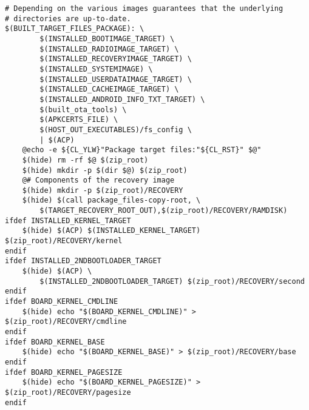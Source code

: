 \documentclass[12pt,a4paper]{article}
\begin{document}
\begin{verbatim}
# Depending on the various images guarantees that the underlying
# directories are up-to-date.
$(BUILT_TARGET_FILES_PACKAGE): \
		$(INSTALLED_BOOTIMAGE_TARGET) \
		$(INSTALLED_RADIOIMAGE_TARGET) \
		$(INSTALLED_RECOVERYIMAGE_TARGET) \
		$(INSTALLED_SYSTEMIMAGE) \
		$(INSTALLED_USERDATAIMAGE_TARGET) \
		$(INSTALLED_CACHEIMAGE_TARGET) \
		$(INSTALLED_ANDROID_INFO_TXT_TARGET) \
		$(built_ota_tools) \
		$(APKCERTS_FILE) \
		$(HOST_OUT_EXECUTABLES)/fs_config \
		| $(ACP)
	@echo -e ${CL_YLW}"Package target files:"${CL_RST}" $@"
	$(hide) rm -rf $@ $(zip_root)
	$(hide) mkdir -p $(dir $@) $(zip_root)
	@# Components of the recovery image
	$(hide) mkdir -p $(zip_root)/RECOVERY
	$(hide) $(call package_files-copy-root, \
		$(TARGET_RECOVERY_ROOT_OUT),$(zip_root)/RECOVERY/RAMDISK)
ifdef INSTALLED_KERNEL_TARGET
	$(hide) $(ACP) $(INSTALLED_KERNEL_TARGET) $(zip_root)/RECOVERY/kernel
endif
ifdef INSTALLED_2NDBOOTLOADER_TARGET
	$(hide) $(ACP) \
		$(INSTALLED_2NDBOOTLOADER_TARGET) $(zip_root)/RECOVERY/second
endif
ifdef BOARD_KERNEL_CMDLINE
	$(hide) echo "$(BOARD_KERNEL_CMDLINE)" > $(zip_root)/RECOVERY/cmdline
endif
ifdef BOARD_KERNEL_BASE
	$(hide) echo "$(BOARD_KERNEL_BASE)" > $(zip_root)/RECOVERY/base
endif
ifdef BOARD_KERNEL_PAGESIZE
	$(hide) echo "$(BOARD_KERNEL_PAGESIZE)" > $(zip_root)/RECOVERY/pagesize
endif


\end{verbatim}
\end{document}
